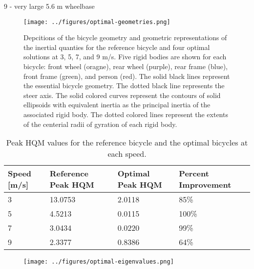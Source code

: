 \documentclass{bmd2019a}
\begin{document}
9
- very large 5.6 m wheelbase
%
\begin{figure}
  \centering
  \texttt{[image: ../figures/optimal-geometries.png]}
  \caption{Depcitions of the bicycle geometry and geometric representations of
    the inertial quanties for the reference bicycle and four optimal solutions
    at 3, 5, 7, and 9 m/s. Five rigid bodies are shown for each bicycle: front
    wheel (oragne), rear wheel (purple), rear frame (blue), front frame
    (green), and person (red). The solid black lines represent the essential
    bicycle geometry. The dotted black line represents the steer axis. The
    solid colored curves represent the contours of solid ellipsoids with
    equivalent inertia as the principal inertia of the associated rigid body.
    The dotted colored lines represent the extents of the centerial radii of
    gyration of each rigid body.}
\end{figure}
%
\begin{table}
  \caption{Peak HQM values for the reference bicycle and the optimal bicycles
    at each speed.}
  \label{tab:hqm}
  \centering
  \begin{tabular}{llll}
    \toprule
    Speed [m/s] & Reference Peak HQM & Optimal Peak HQM & Percent Improvement \\
    \midrule
    3 & 13.0753 & 2.0118 & 85\% \\
    5 & 4.5213  & 0.0115 & 100\% \\
    7 & 3.0434  & 0.0220 &  99\% \\
    9 & 2.3377  & 0.8386 &  64\% \\
    \bottomrule
  \end{tabular}
\end{table}
%
\begin{figure}
  \centering
  \texttt{[image: ../figures/optimal-eigenvalues.png]}
  \caption{}
\end{figure}
%
\end{document}
